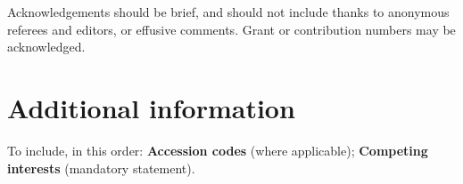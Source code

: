 \documentclass[11pt]{wlscirep}
\begin{document}
Acknowledgements should be brief, and should not include thanks to anonymous referees and editors, or effusive comments. Grant or contribution numbers may be acknowledged.



\section*{Additional information}

To include, in this order: \textbf{Accession codes} (where applicable); \textbf{Competing interests} (mandatory statement). 
\end{document}
